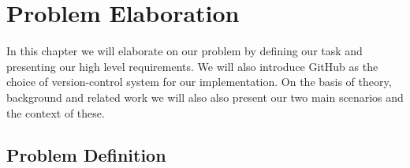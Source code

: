 \chapter{Problem Elaboration}
\label{chap:problemelaboration}
%
%
\label{problemelaboration}
In this chapter we will elaborate on our problem by defining our task and presenting our high level requirements. We will also introduce GitHub as the choice of version-control system for our implementation.
On the basis of theory, background and related work we will also also present our two main scenarios and the context of these. 


\section{Problem Definition}
\label{problemdefinition}

